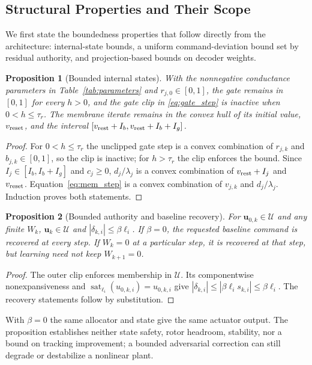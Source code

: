 \documentclass[letterpaper, 10 pt, conference]{ieeeconf}
\newcommand{\sat}{\operatorname{sat}}
\newtheorem{proposition}{Proposition}
\begin{document}
\subsection{Structural Properties and Their Scope}
We first state the boundedness properties that follow directly from the architecture: internal-state bounds, a uniform command-deviation bound set by residual authority, and projection-based bounds on decoder weights.
\begin{proposition}[Bounded internal states]
\label{prop:states}
With the nonnegative conductance parameters in Table~\ref{tab:parameters}
and $r_{j,0}\in[0,1]$, the gate remains in $[0,1]$ for every $h>0$, and the
gate clip in \eqref{eq:gate_step} is inactive when $0<h\le\tau_r$.
The membrane iterate remains in the convex hull of its initial value,
$v_{\rm reset}$, and the interval
$[v_{\rm rest}+I_b,v_{\rm rest}+I_b+I_g]$.
\end{proposition}
\begin{proof}
For $0<h\le\tau_r$ the unclipped gate step is a convex combination of
$r_{j,k}$ and $b_{j,k}\in[0,1]$, so the clip is inactive; for $h>\tau_r$ the
clip enforces the bound. Since $I_j\in[I_b,I_b+I_g]$ and $c_j\ge0$,
$d_j/\lambda_j$ is a convex combination of $v_{\rm rest}+I_j$ and
$v_{\rm reset}$. Equation~\eqref{eq:mem_step} is a convex combination of
$v_{j,k}$ and $d_j/\lambda_j$. Induction proves both statements.
\end{proof}

\begin{proposition}[Bounded authority and baseline recovery]
\label{prop:authority}
For $\bm u_{0,k}\in\mathcal U$ and any finite $W_k$,
$\bm u_k\in\mathcal U$ and $|\delta_{k,i}|\le\beta\ell_i$.
If $\beta=0$, the requested baseline command is recovered at every step.
If $W_k=0$ at a particular step, it is recovered at that step, but learning
need not keep $W_{k+1}=0$.
\end{proposition}
\begin{proof}
The outer clip enforces membership in $\mathcal U$. Its componentwise
nonexpansiveness and $\sat_{\ell_i}(u_{0,k,i})=u_{0,k,i}$ give
$|\delta_{k,i}|\le|\beta\ell_i s_{k,i}|\le\beta\ell_i$.
The recovery statements follow by substitution.
\end{proof}
With $\beta=0$ the same allocator and state give the same actuator output.
The proposition establishes neither state safety, rotor headroom, stability,
nor a bound on tracking improvement; a bounded adversarial correction can
still degrade or destabilize a nonlinear plant.
\end{document}
